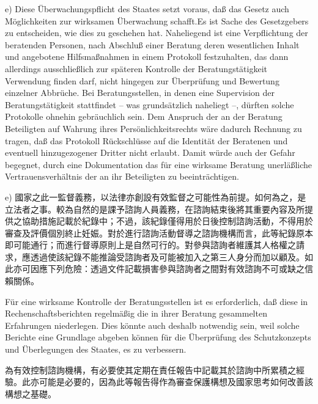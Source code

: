 \documentclass[12pt]{article}
\begin{document}
\begin{sourcepara}[title={原文D.129}]
e) Diese Überwachungspflicht des Staates setzt voraus, daß das Gesetz auch Möglichkeiten zur wirksamen Überwachung schafft.Es ist Sache des Gesetzgebers zu entscheiden, wie dies zu geschehen hat. Naheliegend ist eine Verpflichtung der beratenden Personen, nach Abschluß einer Beratung deren wesentlichen Inhalt und angebotene Hilfsmaßnahmen in einem Protokoll festzuhalten, das dann allerdings ausschließlich zur späteren Kontrolle der Beratungstätigkeit Verwendung finden darf, nicht hingegen zur Überprüfung und Bewertung einzelner Abbrüche. Bei Beratungsstellen, in denen eine Supervision der Beratungstätigkeit stattfindet -- was grundsätzlich naheliegt --, dürften solche Protokolle ohnehin gebräuchlich sein. Dem Anspruch der an der Beratung Beteiligten auf Wahrung ihres Persönlichkeitsrechts wäre dadurch Rechnung zu tragen, daß das Protokoll Rückschlüsse auf die Identität der Beratenen und eventuell hinzugezogener Dritter nicht erlaubt. Damit würde auch der Gefahr begegnet, durch eine Dokumentation das für eine wirksame Beratung unerläßliche Vertrauensverhältnis der an ihr Beteiligten zu beeinträchtigen.
\end{sourcepara}
\begin{transpara}
e) 國家之此一監督義務，以法律亦創設有效監督之可能性為前提。如何為之，是立法者之事。較為自然的是課予諮詢人員義務，在諮詢結束後將其重要內容及所提供之協助措施記載於紀錄中；不過，該紀錄僅得用於日後控制諮詢活動，不得用於審查及評價個別終止妊娠。對於進行諮詢活動督導之諮詢機構而言，此等紀錄原本即可能通行；而進行督導原則上是自然可行的。對參與諮詢者維護其人格權之請求，應透過使該紀錄不能推論受諮詢者及可能被加入之第三人身分而加以顧及。如此亦可因應下列危險：透過文件記載損害參與諮詢者之間對有效諮詢不可或缺之信賴關係。
\end{transpara}

\begin{sourcepara}[title={原文D.130}]
Für eine wirksame Kontrolle der Beratungsstellen ist es erforderlich, daß diese in Rechenschaftsberichten regelmäßig die in ihrer Beratung gesammelten Erfahrungen niederlegen. Dies könnte auch deshalb notwendig sein, weil solche Berichte eine Grundlage abgeben können für die Überprüfung des Schutzkonzepts und Überlegungen des Staates, es zu verbessern.
\end{sourcepara}
\begin{transpara}
為有效控制諮詢機構，有必要使其定期在責任報告中記載其於諮詢中所累積之經驗。此亦可能是必要的，因為此等報告得作為審查保護構想及國家思考如何改善該構想之基礎。
\end{transpara}
\end{document}

